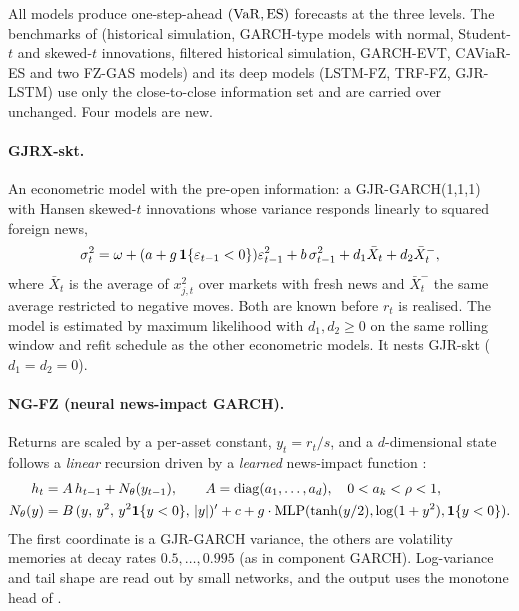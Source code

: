 All models produce one-step-ahead $(\mathrm{VaR},\mathrm{ES})$ forecasts at the three levels. The benchmarks of \citet{agrawal2026learning} (historical simulation, GARCH-type models with normal, Student-$t$ and skewed-$t$ innovations, filtered historical simulation, GARCH-EVT, CAViaR-ES and two FZ-GAS models) and its deep models (LSTM-FZ, TRF-FZ, GJR-LSTM) use only the close-to-close information set and are carried over unchanged. Four models are new.

\paragraph{GJRX-skt.} An econometric model with the pre-open information: a GJR-GARCH(1,1,1) with Hansen skewed-$t$ innovations whose variance responds linearly to squared foreign news,
\begin{equation}\label{eq:gjrx}
\sigma_t^2=\omega+(a+g\,\mathbf{1}\{\varepsilon_{t-1}<0\})\varepsilon_{t-1}^2+b\,\sigma_{t-1}^2+d_1\bar X_t+d_2\bar X_t^-,
\end{equation}
where $\bar X_t$ is the average of $x_{j,t}^2$ over markets with fresh news and $\bar X_t^-$ the same average restricted to negative moves. Both are known before $r_t$ is realised. The model is estimated by maximum likelihood with $d_1,d_2\ge0$ on the same rolling window and refit schedule as the other econometric models. It nests GJR-skt ($d_1=d_2=0$).

\paragraph{NG-FZ (neural news-impact GARCH).} Returns are scaled by a per-asset constant, $y_t=r_t/s$, and a $d$-dimensional state follows a \emph{linear} recursion driven by a \emph{learned} news-impact function \citep{engle1993measuring}:
\begin{align}
h_t&=A\,h_{t-1}+N_\theta(y_{t-1}),\qquad A=\mathrm{diag}(a_1,\dots,a_d),\quad 0<a_k<\rho<1,\label{eq:ng}\\
N_\theta(y)&=B\,(y,\,y^2,\,y^2\mathbf{1}\{y<0\},\,|y|)'+c+g\cdot\mathrm{MLP}(\tanh(y/2),\log(1+y^2),\mathbf{1}\{y<0\}).\nonumber
\end{align}
The first coordinate is a GJR-GARCH variance, the others are volatility memories at decay rates $0.5,\dots,0.995$ (as in component GARCH). Log-variance and tail shape are read out by small networks, and the output uses the monotone head of \citet{agrawal2026learning}.

